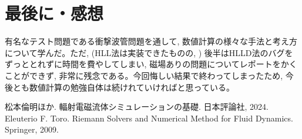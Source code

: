 \documentclass[dvipdfmx,b5paper]{jsarticle}
\begin{document}
\section{最後に・感想}
有名なテスト問題である衝撃波管問題を通して, 数値計算の様々な手法と考え方について学んだ。ただ, (HLL法は実装できたものの, ) 後半はHLLD法のバグをずっととれずに時間を費やしてしまい, 磁場ありの問題についてレポートをかくことができず, 非常に残念である。今回悔しい結果で終わってしまったため, 今後とも数値計算の勉強自体は続けれていければと思っている。

\begin{thebibliography}{9}
  松本倫明ほか. 輻射電磁流体シミュレーションの基礎. 日本評論社, 2024. 
  Eleuterio F. Toro. Riemann Solvers and Numerical Method for Fluid Dynamics. Springer, 2009.
\end{thebibliography}
\end{document}
